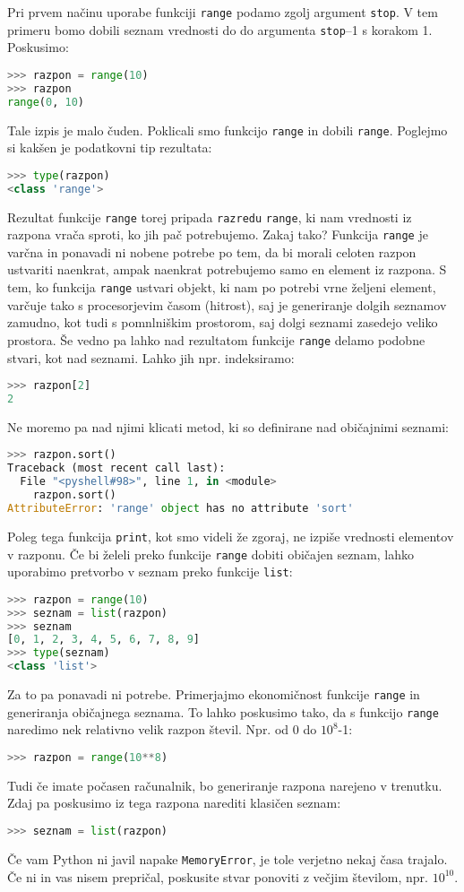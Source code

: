 Pri prvem načinu uporabe funkciji \texttt{range} podamo zgolj argument \texttt{stop}. V tem primeru bomo dobili seznam vrednosti do do argumenta \texttt{stop}--1 s korakom 1. Poskusimo:
\begin{lstlisting}[language=Python]
>>> razpon = range(10)
>>> razpon
range(0, 10)
\end{lstlisting}
Tale izpis je malo čuden. Poklicali smo funkcijo \texttt{range} in dobili \texttt{range}. Poglejmo si kakšen je podatkovni tip rezultata:
\begin{lstlisting}[language=Python]
>>> type(razpon)
<class 'range'>
\end{lstlisting}
Rezultat funkcije \texttt{range} torej pripada \texttt{razredu} \texttt{range}, ki nam vrednosti iz razpona vrača sproti, ko jih pač potrebujemo. Zakaj tako? Funkcija \texttt{range} je varčna in ponavadi ni nobene potrebe po tem, da bi morali celoten razpon ustvariti naenkrat, ampak naenkrat potrebujemo samo en element iz razpona. S tem, ko funkcija \texttt{range} ustvari objekt, ki nam po potrebi vrne željeni element, varčuje tako s procesorjevim časom (hitrost), saj je generiranje dolgih seznamov zamudno, kot tudi s pomnlniškim prostorom, saj dolgi seznami zasedejo veliko prostora. Še vedno pa lahko nad rezultatom funkcije \texttt{range} delamo podobne stvari, kot nad seznami. Lahko jih npr. indeksiramo:
\begin{lstlisting}[language=Python]
>>> razpon[2]
2
\end{lstlisting}
Ne moremo pa nad njimi klicati metod, ki so definirane nad običajnimi seznami:
\begin{lstlisting}[language=Python]
>>> razpon.sort()
Traceback (most recent call last):
  File "<pyshell#98>", line 1, in <module>
    razpon.sort()
AttributeError: 'range' object has no attribute 'sort'
\end{lstlisting}
Poleg tega funkcija \texttt{print}, kot smo videli že zgoraj, ne izpiše vrednosti elementov v razponu. Če bi želeli preko funkcije \texttt{range} dobiti običajen seznam, lahko uporabimo pretvorbo v seznam preko funkcije \texttt{list}:
\begin{lstlisting}[language=Python]
>>> razpon = range(10)
>>> seznam = list(razpon)
>>> seznam
[0, 1, 2, 3, 4, 5, 6, 7, 8, 9]
>>> type(seznam)
<class 'list'>
\end{lstlisting}
Za to pa ponavadi ni potrebe. Primerjajmo ekonomičnost funkcije \texttt{range} in generiranja običajnega seznama. To lahko poskusimo tako, da s funkcijo \texttt{range} naredimo nek relativno velik razpon števil. Npr. od 0 do $10^8$-1:
\begin{lstlisting}[language=Python]
>>> razpon = range(10**8)
\end{lstlisting}
Tudi če imate počasen računalnik, bo generiranje razpona narejeno v trenutku. Zdaj pa poskusimo iz tega razpona narediti klasičen seznam:
\begin{lstlisting}[language=Python]
>>> seznam = list(razpon)
\end{lstlisting}
Če vam Python ni javil napake \texttt{MemoryError}, je tole verjetno nekaj časa trajalo. Če ni in vas nisem prepričal, poskusite stvar ponoviti z večjim številom, npr. $10^10$. 

